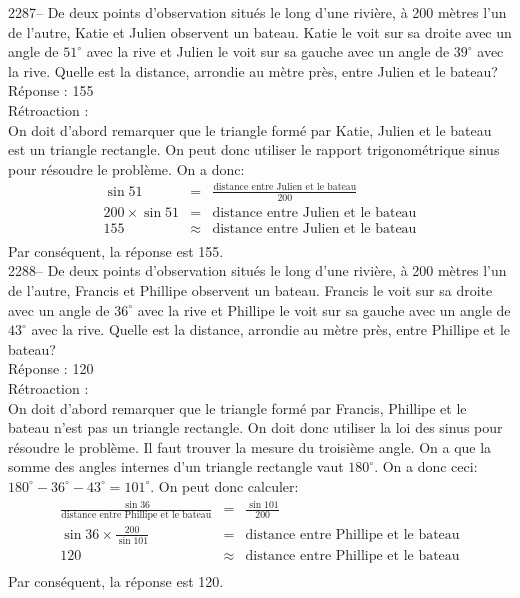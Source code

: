 \documentclass[letterpaper, 12pt]{article}
\begin{document}
2287-- De deux points d'observation situ\'es le long d'une rivi\`ere, \`a 200 m\`etres l'un de l'autre, Katie et Julien observent un bateau. Katie le voit sur sa droite avec un angle de $51^{\circ}$ avec la rive et Julien le voit sur sa gauche avec un angle de $39^{\circ}$ avec la rive. Quelle est la distance, arrondie au m\`etre pr\`es, entre Julien et le bateau?\\

R\'eponse : 155\\

R\'etroaction :\\
On doit d'abord remarquer que le triangle form\'e par Katie, Julien et le bateau est un triangle rectangle. On peut donc utiliser le rapport trigonom\'etrique sinus pour r\'esoudre le probl\`eme. On a donc:
\begin{eqnarray*}
\sin{51}&=&\frac{\textrm{distance entre Julien et le bateau}}{200}\\[2mm]
200\times\sin{51}&=&\textrm{distance entre Julien et le bateau}\\[2mm]
155&\approx&\textrm{distance entre Julien et le bateau}\\
\end{eqnarray*}
Par cons\'equent, la r\'eponse est 155.\\

2288-- De deux points d'observation situ\'es le long d'une rivi\`ere, \`a 200 m\`etres l'un de l'autre, Francis et Phillipe observent un bateau. Francis le voit sur sa droite avec un angle de $36^{\circ}$ avec la rive et Phillipe le voit sur sa gauche avec un angle de $43^{\circ}$ avec la rive. Quelle est la distance, arrondie au m\`etre pr\`es, entre Phillipe et le bateau?\\

R\'eponse : 120\\

R\'etroaction :\\
On doit d'abord remarquer que le triangle form\'e par Francis, Phillipe et le bateau n'est pas un triangle rectangle. On doit donc utiliser la loi des sinus pour r\'esoudre le probl\`eme. Il faut trouver la mesure du troisi\`eme angle. On a que la somme des angles internes d'un triangle rectangle vaut $180^{\circ}$. On a donc ceci: $180^{\circ}-36^{\circ}-43^{\circ}=101^{\circ}$. On peut donc calculer:
\begin{eqnarray*}
\frac{\sin{36}}{\textrm{distance entre Phillipe et le bateau}}&=&\frac{\sin{101}}{200}\\[2mm]
\sin{36}\times \frac{200}{\sin{101}}&=&\textrm{distance entre Phillipe et le bateau}\\[2mm]
120&\approx&\textrm{distance entre Phillipe et le bateau}\\
\end{eqnarray*}
Par cons\'equent, la r\'eponse est 120.\\
\end{document}
